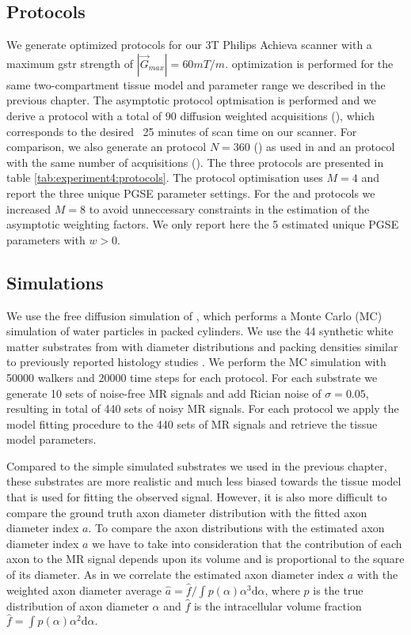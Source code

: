 \subsection{Protocols}
We generate optimized protocols for our 3T Philips Achieva scanner with a maximum {\gls{gstr}} strength of $|\vec{G}_{max}|=60mT/m$. \SFasym{} optimization is performed for the same two-compartment tissue model and parameter range we described in the previous chapter. The asymptotic \SFasym protocol optmisation is performed and we derive a protocol with a total of $90$ diffusion weighted acquisitions (\SFshort), which corresponds to the desired ~25 minutes of scan time on our scanner. For comparison, we also generate an \OI protocol $N=360$ (\OIlong) as used in \citep{Alexander:2010} and an \SFasym protocol with the same number of acquisitions (\SFlong). The three protocols are presented in table \ref{tab:experiment4:protocols}. The \OIlong{} protocol optimisation uses $M=4$ and report the three unique {\gls{PGSE}} parameter settings. For the \SFshort{} and \SFlong{} protocols we increased $M=8$ to avoid unneccessary constraints in the estimation of the asymptotic weighting factors. We only report here the 5 estimated unique PGSE parameters with $w>0$.
\subsection{Simulations}
We use the free diffusion simulation of \citet{Hall:2009}, which performs a Monte Carlo (MC) simulation of water particles in packed cylinders. We use the 44 synthetic white matter substrates from\citet{Alexander:2010} with diameter distributions and packing densities similar to previously reported histology studies \citep{GrafvonKeyserlingk:1984,LaMantia:1990,Aboitiz:1992}.%
We perform the MC simulation with 50000 walkers and 20000 time steps for each protocol. For each substrate we generate 10 sets of noise-free MR signals and add Rician noise of $\sigma=0.05$, resulting in  total of 440 sets of noisy MR signals. For each protocol we apply the model fitting procedure to the 440 sets of MR signals and retrieve the tissue model parameters.

Compared to the simple simulated substrates we used in the previous chapter, these substrates are more realistic and much less biased towards the tissue model that is used for fitting the observed signal. However, it is also more difficult to compare the ground truth axon diameter distribution with the fitted axon diameter index $a$. To compare the axon distributions with the estimated axon diameter index $a$ we have to take into consideration that the contribution of each axon to the MR signal depends upon its volume and is proportional to the square of its diameter. As in \citet{Alexander:2010} we correlate the estimated axon diameter index $a$ with the weighted axon diameter average $\hat{a} = \hat{f} / \int p(\alpha)\alpha^3\mbox{d}\alpha$, where $p$ is the true distribution of axon diameter $\alpha$ and $\hat{f}$ is the intracellular volume fraction $\hat{f} = \int p(\alpha)\alpha^2\mbox{d}\alpha.$


